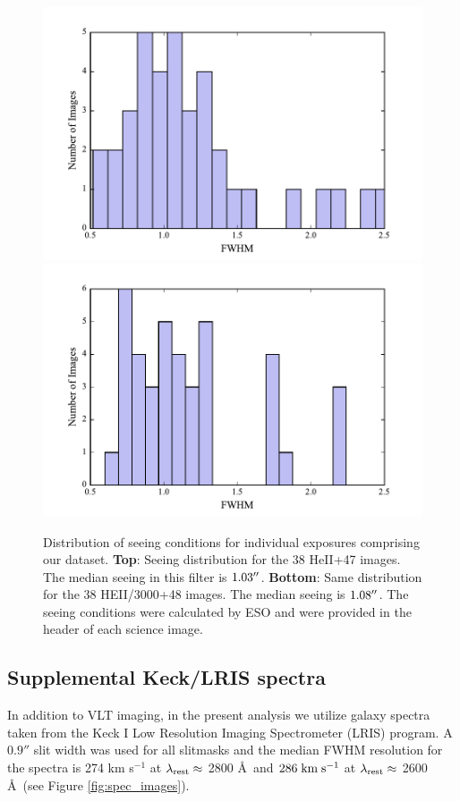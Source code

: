 \documentclass[twocolumn]{aastex61}
\def \mkms {{\rm \; km\;s^{-1}}}
\begin{document}
\begin{figure}[h]
\centering
\includegraphics[scale=.55]{../Figures/avg_seeing_HEII.pdf}
\includegraphics[scale=.55]{../Figures/avg_seeing_HEII3000.pdf}
\caption{  Distribution of seeing conditions for individual exposures comprising our dataset.
\textbf{Top}: Seeing distribution for the 38 HeII+47 images. The median seeing in this filter is $1.03\mbox{$^{\prime\prime}$}$.
\textbf{Bottom}: Same distribution for the 38 HEII/3000+48 images. The median seeing is $1.08\mbox{$^{\prime\prime}$}$. 
The seeing conditions were calculated by ESO and were provided in the header of each science image.
\label{fig.seeing}}
\end{figure}



\subsection{Supplemental Keck/LRIS spectra}
In addition to VLT imaging, in the present analysis we utilize galaxy spectra taken from the \cite{Rubin_2014} Keck I Low Resolution Imaging Spectrometer (LRIS) program. A $0.9''$ slit width was used for all slitmasks and the median FWHM resolution for the spectra is 274 km s$^{-1}$ at $\lambda_{\rm rest} \approx$ 2800 \AA\ and $286\mkms$  at $\lambda_{\rm rest}\approx$ 2600 \AA\ (see Figure \ref{fig:spec_images}).
\end{document}
